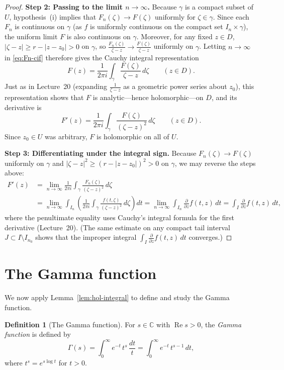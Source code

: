 \documentclass[11pt]{article}
\theoremstyle{plain}
\theoremstyle{definition}
\newtheorem{definition}[theorem]{Definition}
\theoremstyle{boldremark}
\theoremstyle{remark}
\numberwithin{equation}{section}
\newcommand{\C}{\mathbb{C}}
\DeclareMathOperator{\Real}{Re}
\begin{document}
\begin{proof}
\textbf{Step 2: Passing to the limit $n\to\infty$.}
Because $\gamma$ is a compact subset of $U$, hypothesis~(i) implies that
$F_n(\zeta)\to F(\zeta)$ uniformly for $\zeta\in\gamma$. Since each $F_n$
is continuous on $\gamma$ (as $f$ is uniformly continuous on the compact
set $I_n\times\gamma$), the uniform limit $F$ is also continuous on
$\gamma$. Moreover, for any fixed $z\in D$, $|\zeta-z|\geq r-|z-z_0|>0$ on
$\gamma$, so $\frac{F_n(\zeta)}{\zeta-z}\to\frac{F(\zeta)}{\zeta-z}$
uniformly on $\gamma$. Letting $n\to\infty$ in \eqref{eq:Fn-cif} therefore
gives the Cauchy integral representation
\[
 F(z) = \frac{1}{2\pi i}\int_{\gamma}\frac{F(\zeta)}{\zeta-z}\,d\zeta
 \qquad (z\in D).
\]
Just as in Lecture~20 (expanding $\frac{1}{\zeta-z}$ as a geometric power
series about $z_0$), this representation shows that $F$ is analytic---hence
holomorphic---on $D$, and its derivative is
\[
 F'(z) = \frac{1}{2\pi i}\int_{\gamma}\frac{F(\zeta)}{(\zeta-z)^2}\,d\zeta
 \qquad (z\in D).
\]
Since $z_0\in U$ was arbitrary, $F$ is holomorphic on all of $U$.

\textbf{Step 3: Differentiating under the integral sign.}
Because $F_n(\zeta)\to F(\zeta)$ uniformly on $\gamma$ and
$|\zeta-z|^2\geq(r-|z-z_0|)^2>0$ on $\gamma$, we may reverse the steps
above:
\begin{align*}
 F'(z)
 &= \lim_{n\to\infty}\frac{1}{2\pi i}
    \int_{\gamma}\frac{F_n(\zeta)}{(\zeta-z)^2}\,d\zeta \\
 &= \lim_{n\to\infty}\int_{I_n}
    \left(\frac{1}{2\pi i}\int_{\gamma}
    \frac{f(t,\zeta)}{(\zeta-z)^2}\,d\zeta\right)dt
  = \lim_{n\to\infty}\int_{I_n}\frac{\partial}{\partial z}f(t,z)\,dt
  = \int_I \frac{\partial}{\partial z}f(t,z)\,dt,
\end{align*}
where the penultimate equality uses Cauchy's integral formula for the first
derivative (Lecture~20). (The same estimate on any compact tail interval
$J\subset I\setminus I_{n_0}$ shows that the improper integral
$\int_I\frac{\partial}{\partial z}f(t,z)\,dt$ converges.)
\end{proof}


\section{The Gamma function}

We now apply Lemma~\ref{lem:hol-integral} to define and study the Gamma
function.

\begin{definition}[The Gamma function]
For $s\in\C$ with $\Real s > 0$, the \emph{Gamma function} is defined by
\[
 \Gamma(s) = \int_0^{\infty} e^{-t}\,t^s\,\frac{dt}{t}
           = \int_0^{\infty} e^{-t}\,t^{s-1}\,dt,
\]
where $t^s = e^{s\log t}$ for $t>0$.
\end{definition}
\end{document}
